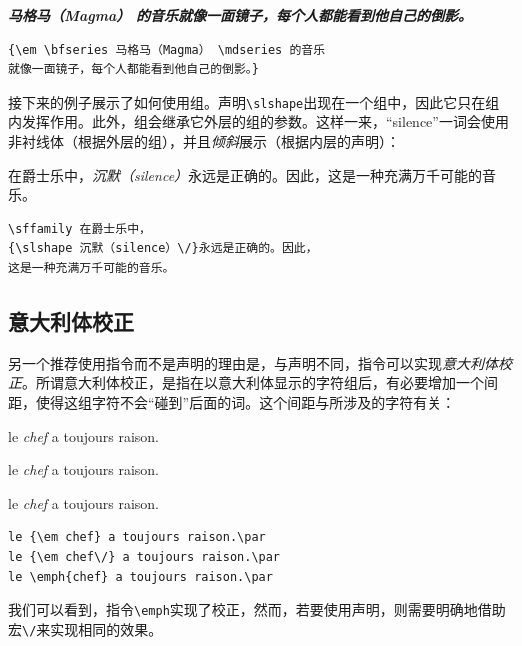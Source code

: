 \begin{codelist}[2.2]{
    {\em \bfseries 马格马（Magma） \mdseries 的音乐就像一面镜子，每个人都能看到他自己的倒影。}
}
\begin{verbatim}
{\em \bfseries 马格马（Magma） \mdseries 的音乐
就像一面镜子，每个人都能看到他自己的倒影。}\end{verbatim}
\end{codelist}

接下来的例子展示了如何使用组。声明\verb|\slshape|出现在一个组中，因此它只在组内发挥作用。此外，组会继承它外层的组的参数。这样一来，“silence”一词会使用\textsf{非衬线}体（根据外层的组），并且\textsl{倾斜}展示（根据内层的声明）：

\begin{codelist}[2.3]{
    \sffamily 在爵士乐中，{\slshape 沉默（silence）\/}永远是正确的。因此，这是一种充满万千可能的音乐。
}
\begin{verbatim}\sffamily 在爵士乐中，
{\slshape 沉默（silence）\/}永远是正确的。因此，
这是一种充满万千可能的音乐。\end{verbatim}
\end{codelist}

\subsection{意大利体校正}

另一个推荐使用指令而不是声明的理由是，与声明不同，指令可以实现\emph{意大利体校正}。所谓意大利体校正，是指在以意大利体显示的字符组后，有必要增加一个间距，使得这组字符不会“碰到”后面的词。这个间距与所涉及的字符有关：

\begin{codelist}[2.4]{
    le {\em chef} a toujours raison.\par
    le {\em chef\/} a toujours raison.\par
    le \emph{chef} a toujours raison.\par
}
\begin{verbatim}
le {\em chef} a toujours raison.\par
le {\em chef\/} a toujours raison.\par
le \emph{chef} a toujours raison.\par\end{verbatim}
\end{codelist}

我们可以看到，指令\verb|\emph|实现了校正，然而，若要使用声明，则需要明确地借助宏\verb|\/|来实现相同的效果。

